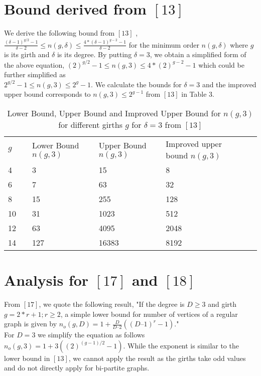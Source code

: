 \documentclass{llncs}
\begin{document}
\section {Bound derived from $[13]$}
We derive the following bound from $[13]$ , $\frac{(\delta -1)^{g/2}-1}{\delta -2}\le n(g,\delta )\le \frac{4\ast {(\delta -1)^{g-2}-1}}{\delta -2}$ for the minimum order $n(g, \delta)$ where $g$ is its girth and $\delta$ is its degree. By putting  $\delta =3$, we obtain a simplified form of the above equation, ${(2)^{g/2}-1}\le n(g,3 )\le 4\ast {(2)^{g-2}-1}$ which could be further simplified as \\ ${2^{g/2}-1}\le n(g,3 )\le  {2^{g}-1}$.
We calculate the bounds for $\delta =3$ and the improved upper bound corresponds to $n(g,3)\le 2^{g-1}$ from $[13]$ in Table $3$. 

\begin{table}
\caption{Lower Bound, Upper Bound and Improved Upper Bound for $n(g,3)$ for different girths $g$ for $\delta =3$ from $[13]$ }
\begin{tabular}{llllll}
\hline\noalign{\smallskip}
$g$ && Lower Bound $n(g,3)$ & Upper Bound $n(g,3)$ & Improved upper bound $n(g,3)$ \\
\noalign{\smallskip}
\hline
\noalign{\smallskip}
4 && 3  & 15 & 8 \\
6 && 7 & 63  & 32\\
8 && 15 & 255 & 128  \\
10 && 31  & 1023 & 512\\
12 && 63 & 4095 & 2048 \\
14 && 127 & 16383 & 8192  \\
\hline
\end{tabular}
\end{table}

\section {Analysis for  $[17]$ and  $[18]$}

From $[17]$, we quote the following result, 
"If the degree is  $D\ge 3$ and girth  $g=2\ast r+1;r\ge 2$, a simple lower bound for number of vertices of a regular graph is given by $n_{o}(g,D)=1+\frac{D}{D\text{--}2}((D\text{--}1)^{r}-1)$." \\ For  $D=3$ we simplify the equation as follows  $n_{o}(g,3)=1+3((2)^{(g-1)/2}-1)$. While the exponent is similar to the lower bound in  $[13]$, we cannot apply the result as the girths take odd values and do not directly apply for bi-partite graphs. 
\end{document}
